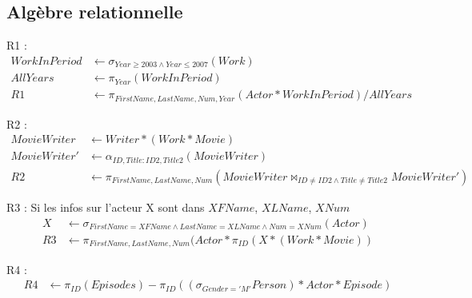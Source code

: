 \documentclass[a4paper,12pt]{article}
\begin{document}
\subsection{Algèbre relationnelle}
\begin{list}{-}{}
  \item R1 :
    \begin{align*}
      WorkInPeriod & \leftarrow \sigma_{Year \geq 2003 \wedge Year \leq 2007} (Work) \\
      AllYears & \leftarrow \pi_{Year} (WorkInPeriod)\\
      R1 & \leftarrow \pi_{FirstName, LastName, Num, Year} (Actor * WorkInPeriod) / AllYears
    \end{align*}
  \item R2 :
    \begin{align*}
      MovieWriter & \leftarrow Writer * (Work * Movie) \\
      MovieWriter' & \leftarrow \alpha_{ID,Title:ID2,Title2} (MovieWriter) \\
      R2 & \leftarrow \pi_{FirstName,LastName,Num} (MovieWriter \Join_{ID \neq ID2 \wedge Title \neq Title2} MovieWriter')
    \end{align*}
  \item R3 :
    Si les infos sur l'acteur X sont dans $XFName$, $XLName$, $XNum$
    \begin{align*}
      X & \leftarrow \sigma_{FirstName = XFName \wedge LastName = XLName \wedge Num = XNum} (Actor) \\
      R3 & \leftarrow \pi_{FirstName,LastName,Num}(Actor*\pi_{ID} (X * (Work * Movie))
    \end{align*}
  \item R4 :
    \begin{align*}
      R4 & \leftarrow \pi_{ID} (Episodes) - \pi_{ID} ((\sigma_{Gender='M'} Person) * Actor * Episode)
    \end{align*}
\end{list}
\end{document}
